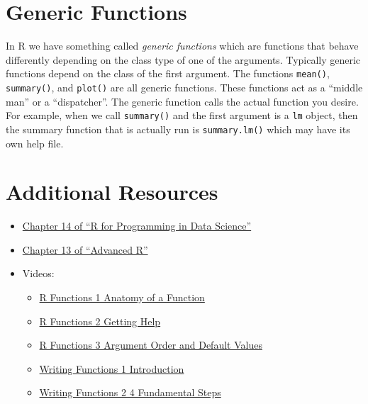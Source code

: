 \documentclass[
]{book}
\providecommand{\tightlist}{%
  \setlength{\itemsep}{0pt}\setlength{\parskip}{0pt}}
\begin{document}
\hypertarget{generic-functions}{%
\section{Generic Functions}\label{generic-functions}}

In R we have something called \emph{generic functions} which are functions that behave differently depending on the class type of one of the arguments. Typically generic functions depend on the class of the first argument. The functions \texttt{mean()}, \texttt{summary()}, and \texttt{plot()} are all generic functions. These functions act as a ``middle man'' or a ``dispatcher''. The generic function calls the actual function you desire. For example, when we call \texttt{summary()} and the first argument is a \texttt{lm} object, then the summary function that is actually run is \texttt{summary.lm()} which may have its own help file.

\hypertarget{additional-resources-2}{%
\section{Additional Resources}\label{additional-resources-2}}

\begin{itemize}
\tightlist
\item
  \href{https://bookdown.org/rdpeng/rprogdatascience/functions.html\#the-...-argument}{Chapter 14 of ``R for Programming in Data Science''}
\item
  \href{https://adv-r.hadley.nz/s3.html}{Chapter 13 of ``Advanced R''}
\item
  Videos:

  \begin{itemize}
  \tightlist
  \item
    \href{https://ucr.yuja.com/V/Video?v=2390137\&node=8588230\&a=1409376127\&autoplay=1}{R Functions 1 \textbar{} Anatomy of a Function}
  \item
    \href{https://ucr.yuja.com/V/Video?v=2368890\&node=8488096\&a=1477744713\&autoplay=1}{R Functions 2 \textbar{} Getting Help}
  \item
    \href{https://ucr.yuja.com/V/Video?v=2368889\&node=8488095\&a=762120086\&autoplay=1}{R Functions 3 \textbar{} Argument Order and Default Values}
  \item
    \href{https://ucr.yuja.com/V/Video?v=2700489\&node=9649685\&a=1404409900\&autoplay=1}{Writing Functions 1 \textbar{} Introduction}
  \item
    \href{https://ucr.yuja.com/V/Video?v=2700492\&node=9649688\&a=604881114\&autoplay=1}{Writing Functions 2 \textbar{} 4 Fundamental Steps}
  \end{itemize}
\end{itemize}
\end{document}
